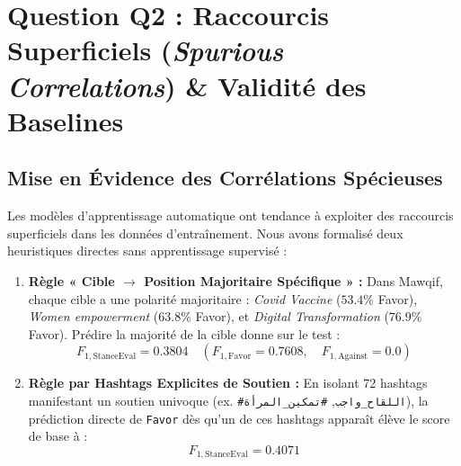 \documentclass[11pt,a4paper]{article}
\begin{document}
\section{Question Q2 : Raccourcis Superficiels (\textit{Spurious Correlations}) \& Validité des Baselines}

\subsection{Mise en Évidence des Corrélations Spécieuses}
Les modèles d'apprentissage automatique ont tendance à exploiter des raccourcis superficiels dans les données d'entraînement. Nous avons formalisé deux heuristiques directes sans apprentissage supervisé :
\begin{enumerate}
    \item \textbf{Règle « Cible $\to$ Position Majoritaire Spécifique » :}
    Dans Mawqif, chaque cible a une polarité majoritaire : \textit{Covid Vaccine} ($53.4\%$ Favor), \textit{Women empowerment} ($63.8\%$ Favor), et \textit{Digital Transformation} ($76.9\%$ Favor). Prédire la majorité de la cible donne sur le test :
    \begin{equation}
        F_{1,\text{StanceEval}} = \mathbf{0.3804} \quad (F_{1,\text{Favor}} = 0.7608, \quad F_{1,\text{Against}} = 0.0)
    \end{equation}
    \item \textbf{Règle par Hashtags Explicites de Soutien :}
    En isolant 72 hashtags manifestant un soutien univoque (ex. \texttt{\#اللقاح\_واجب}, \texttt{\#تمكين\_المرأة}), la prédiction directe de \texttt{Favor} dès qu'un de ces hashtags apparaît élève le score de base à :
    \begin{equation}
        F_{1,\text{StanceEval}} = \mathbf{0.4071}
    \end{equation}
\end{enumerate}
\end{document}
